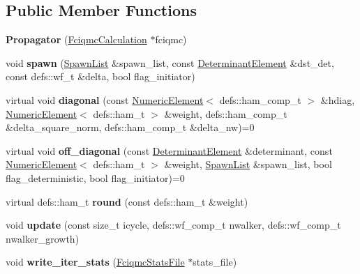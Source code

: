 \subsection*{Public Member Functions}
\begin{DoxyCompactItemize}
\item 
{\bfseries Propagator} (\hyperlink{classFciqmcCalculation}{Fciqmc\+Calculation} $\ast$fciqmc)\hypertarget{classPropagator_acd1e3b7e54bc7d5355147af9537ef293}{}\label{classPropagator_acd1e3b7e54bc7d5355147af9537ef293}

\item 
void {\bfseries spawn} (\hyperlink{structSpawnList}{Spawn\+List} \&spawn\+\_\+list, const \hyperlink{classDeterminantElement}{Determinant\+Element} \&dst\+\_\+det, const defs\+::wf\+\_\+t \&delta, bool flag\+\_\+initiator)\hypertarget{classPropagator_a108e9965b4c81d2d10eaa803c319ac1c}{}\label{classPropagator_a108e9965b4c81d2d10eaa803c319ac1c}

\item 
virtual void {\bfseries diagonal} (const \hyperlink{classNumericElement}{Numeric\+Element}$<$ defs\+::ham\+\_\+comp\+\_\+t $>$ \&hdiag, \hyperlink{classNumericElement}{Numeric\+Element}$<$ defs\+::ham\+\_\+t $>$ \&weight, defs\+::ham\+\_\+comp\+\_\+t \&delta\+\_\+square\+\_\+norm, defs\+::ham\+\_\+comp\+\_\+t \&delta\+\_\+nw)=0\hypertarget{classPropagator_aa8085bdb4936f6a949a9b67983c59dc8}{}\label{classPropagator_aa8085bdb4936f6a949a9b67983c59dc8}

\item 
virtual void {\bfseries off\+\_\+diagonal} (const \hyperlink{classDeterminantElement}{Determinant\+Element} \&determinant, const \hyperlink{classNumericElement}{Numeric\+Element}$<$ defs\+::ham\+\_\+t $>$ \&weight, \hyperlink{structSpawnList}{Spawn\+List} \&spawn\+\_\+list, bool flag\+\_\+deterministic, bool flag\+\_\+initiator)=0\hypertarget{classPropagator_a810395559ba2da04135c5ad2f0e66f5d}{}\label{classPropagator_a810395559ba2da04135c5ad2f0e66f5d}

\item 
virtual defs\+::ham\+\_\+t {\bfseries round} (const defs\+::ham\+\_\+t \&weight)\hypertarget{classPropagator_ac7ec659c02b60b85d2d85439f727a796}{}\label{classPropagator_ac7ec659c02b60b85d2d85439f727a796}

\item 
void {\bfseries update} (const size\+\_\+t icycle, defs\+::wf\+\_\+comp\+\_\+t nwalker, defs\+::wf\+\_\+comp\+\_\+t nwalker\+\_\+growth)\hypertarget{classPropagator_aaef6837a7e4ba4d2e2a45e88263ee93f}{}\label{classPropagator_aaef6837a7e4ba4d2e2a45e88263ee93f}

\item 
void {\bfseries write\+\_\+iter\+\_\+stats} (\hyperlink{structFciqmcStatsFile}{Fciqmc\+Stats\+File} $\ast$stats\+\_\+file)\hypertarget{classPropagator_aec8f6876201ced3fd9679a9ca7a69932}{}\label{classPropagator_aec8f6876201ced3fd9679a9ca7a69932}

\end{DoxyCompactItemize}
